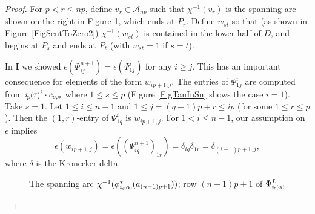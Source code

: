 \documentclass[11pt]{amsart}
\def\A{{\mathcal A}}
\newcommand*{\smallp}[1]{\scalebox{.75}{\ensuremath#1}}
\newcommand*{\subsmallp}[1]{\scalebox{.5}{\ensuremath#1}}
\newcommand{\pp}[2][p]{\imath_{\hspace*{-1pt}#1}\hspace*{-.5pt}\smallp(#2\smallp)}
\newcommand{\subpp}[2][p]{\imath_{\hspace*{-1pt}#1}\hspace*{-.5pt}\subsmallp(#2\subsmallp)}
\theoremstyle{definition}
\begin{document}
\begin{proof}
For $p< r \le np$, define $v_r\in\A_{np}$ such that $\chi^{-1}(v_r)$ is the spanning arc shown on the right in Figure \ref{FigPhiLCalcPhi}, which ends at $P_r$. Define $w_{st}$ so that (as shown in Figure \ref{FigSentToZero2}) $\chi^{-1}(w_{st})$ is contained in the lower half of $D$, and begins at $P_s$ and ends at $P_t$ (with $w_{st}=1$ if $s=t$).

In {\bf I} we showed $\epsilon(\Phi_{ij}^{n+1}) = \epsilon(\Psi_{1j}^i)$ for any $i\ge j$. This has an important consequence for elements of the form $w_{ip+1,j}$. The entries of $\Psi_{1j}^i$ are computed from $\pp\tau^i\cdot c_{s,\ast}$ where $1\le s\le p$ (Figure \ref{FigTauInSn} shows the case $i=1$). Take $s=1$. Let $1\le i\le n-1$ and $1\le j=(q-1)p+r\le ip$ (for some $1\le r\le p$). Then the $(1,r)$-entry of $\Psi_{1q}^i$ is $w_{ip+1,j}$. For $1<i\le n-1$, our assumption on $\epsilon$ implies
    \begin{equation}
    \epsilon(w_{ip+1,j})=\epsilon((\Psi_{iq}^{n+1})_{1r}) = \delta_{iq}\delta_{1r} = \delta_{(i-1)p+1,j},
    \label{EqnMod1Ws}
    \end{equation}
where $\delta$ is the Kronecker-delta. 

    \begin{figure}[ht]
      \caption{The spanning arc $\chi^{-1}(\phi^\ast_{\subpp\alpha}(a_{(n-1)p+1}))$; row $(n-1)p+1$ of $\Phi_{\subpp\alpha}^L$}
      \label{FigPhiLCalcPhi}
    \end{figure}


\end{proof}
\end{document}
